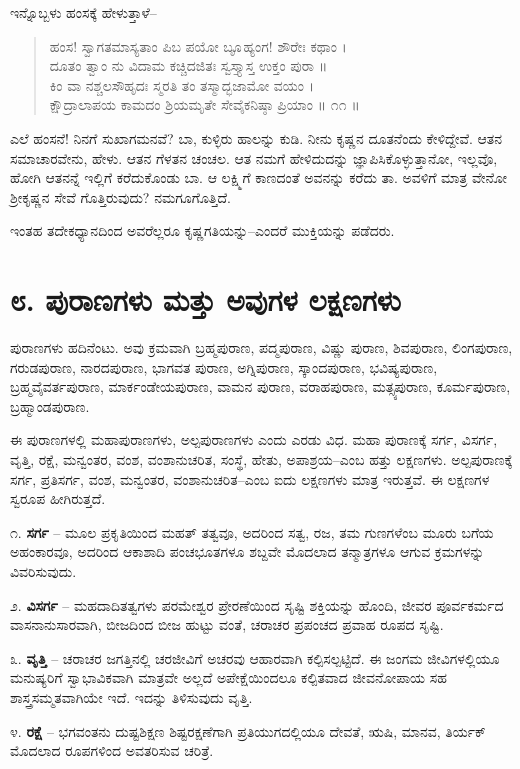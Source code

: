 ಇನ್ನೊಬ್ಬಳು ಹಂಸಕ್ಕೆ ಹೇಳುತ್ತಾಳೆ–

\begin{verse}
ಹಂಸ! ಸ್ವಾಗತಮಾಸ್ಯತಾಂ ಪಿಬ ಪಯೋ ಬೂೃಹ್ಯಂಗ! ಶೌರೇಃ ಕಥಾಂ ।\\ದೂತಂ ತ್ವಾಂ ನು ವಿದಾಮ ಕಚ್ಚಿದಜಿತಃ ಸ್ವಸ್ತ್ಯಾಸ್ತ ಉಕ್ತಂ ಪುರಾ ॥\\ಕಿಂ ವಾ ನಶ್ಚಲಸೌಹೃದಃ ಸ್ಮರತಿ ತಂ ತಸ್ಮಾದ್ಭಜಾಮೋ ವಯಂ ।\\ಕ್ಷೌದ್ರಾಲಾಪಯ ಕಾಮದಂ ಶ್ರಿಯಮೃತೇ ಸೇವೈಕನಿಷ್ಠಾ ಪ್ರಿಯಾಂ \num{॥ ೧೧ ॥}
\end{verse}

ಎಲೆ ಹಂಸನೆ! ನಿನಗೆ ಸುಖಾಗಮನವೆ? ಬಾ, ಕುಳ್ಳಿರು ಹಾಲನ್ನು ಕುಡಿ. ನೀನು ಕೃಷ್ಣನ ದೂತನೆಂದು ಕೇಳಿದ್ದೇವೆ. ಆತನ ಸಮಾಚಾರವೇನು, ಹೇಳು. ಆತನ ಗೆಳತನ ಚಂಚಲ. ಆತ ನಮಗೆ ಹೇಳಿದುದನ್ನು ಜ್ಞಾಪಿಸಿಕೊಳ್ಳುತ್ತಾನೋ, ಇಲ್ಲವೊ, ಹೋಗಿ ಆತನನ್ನೆ ಇಲ್ಲಿಗೆ ಕರೆದುಕೊಂಡು ಬಾ. ಆ ಲಕ್ಷ್ಮಿಗೆ ಕಾಣದಂತೆ ಅವನನ್ನು ಕರೆದು ತಾ. ಅವಳಿಗೆ ಮಾತ್ರ ವೇನೋ ಶ್ರೀಕೃಷ್ಣನ ಸೇವೆ ಗೊತ್ತಿರುವುದು? ನಮಗೂಗೊತ್ತಿದೆ.

ಇಂತಹ ತದೇಕಧ್ಯಾನದಿಂದ ಅವರೆಲ್ಲರೂ ಕೃಷ್ಣಗತಿಯನ್ನು–ಎಂದರೆ ಮುಕ್ತಿಯನ್ನು ಪಡೆದರು.


\section{೮. ಪುರಾಣಗಳು ಮತ್ತು ಅವುಗಳ ಲಕ್ಷಣಗಳು}

ಪುರಾಣಗಳು ಹದಿನೆಂಟು. ಅವು ಕ್ರಮವಾಗಿ ಬ್ರಹ್ಮಪುರಾಣ, ಪದ್ಮಪುರಾಣ, ವಿಷ್ಣು ಪುರಾಣ, ಶಿವಪುರಾಣ, ಲಿಂಗಪುರಾಣ, ಗರುಡಪುರಾಣ, ನಾರದಪುರಾಣ, ಭಾಗವತ ಪುರಾಣ, ಅಗ್ನಿಪುರಾಣ, ಸ್ಕಾಂದಪುರಾಣ, ಭವಿಷ್ಯಪುರಾಣ, ಬ್ರಹ್ಮವೈವರ್ತಪುರಾಣ, ಮಾರ್ಕಂಡೇಯಪುರಾಣ, ವಾಮನ ಪುರಾಣ, ವರಾಹಪುರಾಣ, ಮತ್ಸ್ಯಪುರಾಣ, ಕೂರ್ಮಪುರಾಣ, ಬ್ರಹ್ಮಾಂಡಪುರಾಣ.

ಈ ಪುರಾಣಗಳಲ್ಲಿ ಮಹಾಪುರಾಣಗಳು, ಅಲ್ಪಪುರಾಣಗಳು ಎಂದು ಎರಡು ವಿಧ. ಮಹಾ ಪುರಾಣಕ್ಕೆ ಸರ್ಗ, ವಿಸರ್ಗ, ವೃತ್ತಿ, ರಕ್ಷೆ, ಮನ್ವಂತರ, ವಂಶ, ವಂಶಾನುಚರಿತ, ಸಂಸ್ಥೆ, ಹೇತು, ಅಪಾಶ್ರಯ–ಎಂಬ ಹತ್ತು ಲಕ್ಷಣಗಳು. ಅಲ್ಪಪುರಾಣಕ್ಕೆ ಸರ್ಗ, ಪ್ರತಿಸರ್ಗ, ವಂಶ, ಮನ್ವಂತರ, ವಂಶಾನುಚರಿತ–ಎಂಬ ಐದು ಲಕ್ಷಣಗಳು ಮಾತ್ರ ಇರುತ್ತವೆ. ಈ ಲಕ್ಷಣಗಳ ಸ್ವರೂಪ ಹೀಗಿರುತ್ತದೆ.

೧. \textbf{ಸರ್ಗ} – ಮೂಲ ಪ್ರಕೃತಿಯಿಂದ ಮಹತ್ ತತ್ವವೂ, ಅದರಿಂದ ಸತ್ವ, ರಜ, ತಮ ಗುಣಗಳೆಂಬ ಮೂರು ಬಗೆಯ ಅಹಂಕಾರವೂ, ಅದರಿಂದ ಆಕಾಶಾದಿ ಪಂಚಭೂತಗಳೂ ಶಬ್ದವೇ ಮೊದಲಾದ ತನ್ಮಾತ್ರಗಳೂ ಆಗುವ ಕ್ರಮಗಳನ್ನು ವಿವರಿಸುವುದು.

೨. \textbf{ವಿಸರ್ಗ} – ಮಹದಾದಿತತ್ವಗಳು ಪರಮೇಶ್ವರ ಪ್ರೇರಣೆಯಿಂದ ಸೃಷ್ಟಿ ಶಕ್ತಿಯನ್ನು ಹೊಂದಿ, ಜೀವರ ಪೂರ್ವಕರ್ಮದ ವಾಸನಾನುಸಾರವಾಗಿ, ಬೀಜದಿಂದ ಬೀಜ ಹುಟ್ಟು ವಂತೆ, ಚರಾಚರ ಪ್ರಪಂಚದ ಪ್ರವಾಹ ರೂಪದ ಸೃಷ್ಟಿ.

೩. \textbf{ವೃತ್ತಿ} – ಚರಾಚರ ಜಗತ್ತಿನಲ್ಲಿ ಚರಜೀವಿಗೆ ಅಚರವು ಆಹಾರವಾಗಿ ಕಲ್ಪಿಸಲ್ಪಟ್ಟಿದೆ. ಈ ಜಂಗಮ ಜೀವಿಗಳಲ್ಲಿಯೂ ಮನುಷ್ಯರಿಗೆ ಸ್ವಾಭಾವಿಕವಾಗಿ ಮಾತ್ರವೇ ಅಲ್ಲದೆ ಅಪೇಕ್ಷೆಯಿಂದಲೂ ಕಲ್ಪಿತವಾದ ಜೀವನೋಪಾಯ ಸಹ ಶಾಸ್ತ್ರಸಮ್ಮತವಾಗಿಯೇ ಇದೆ. ಇದನ್ನು ತಿಳಿಸುವುದು ವೃತ್ತಿ.

೪. \textbf{ರಕ್ಷೆ} – ಭಗವಂತನು ದುಷ್ಟಶಿಕ್ಷಣ ಶಿಷ್ಟರಕ್ಷಣೆಗಾಗಿ ಪ್ರತಿಯುಗದಲ್ಲಿಯೂ ದೇವತೆ, ಋಷಿ, ಮಾನವ, ತಿರ್ಯಕ್ ಮೊದಲಾದ ರೂಪಗಳಿಂದ ಅವತರಿಸುವ ಚರಿತ್ರೆ.

